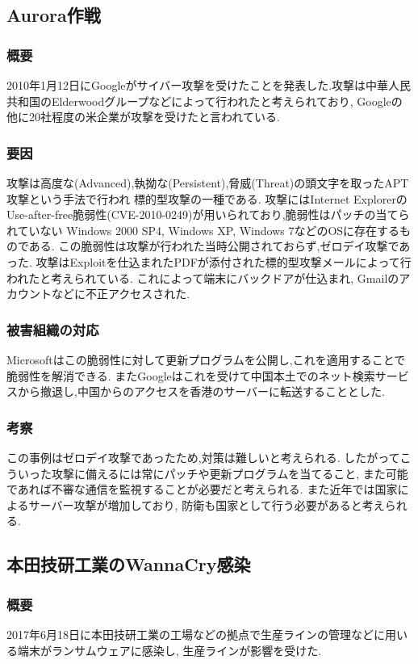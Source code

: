 \documentclass[uplatex,a4j,11pt,dvipdfmx]{jsarticle}
\begin{document}
\subsection{Aurora作戦}
\subsubsection{概要}
2010年1月12日にGoogleがサイバー攻撃を受けたことを発表した.攻撃は中華人民共和国のElderwoodグループなどによって行われたと考えられており,
Googleの他に20社程度の米企業が攻撃を受けたと言われている.\cite{Operatio61:online}
\subsubsection{要因}
攻撃は高度な(Advanced),執拗な(Persistent),脅威(Threat)の頭文字を取ったAPT攻撃という手法で行われ
標的型攻撃の一種である.
攻撃にはInternet ExplorerのUse-after-free脆弱性(CVE-2010-0249)が用いられており,脆弱性はパッチの当てられていない
Windows 2000 SP4, Windows XP, Windows 7などのOSに存在するものである.\cite{CVECVE2083:online}
この脆弱性は攻撃が行われた当時公開されておらず,ゼロデイ攻撃であった.
攻撃はExploitを仕込まれたPDFが添付された標的型攻撃メールによって行われたと考えられている.
これによって端末にバックドアが仕込まれ, Gmailのアカウントなどに不正アクセスされた.
\subsubsection{被害組織の対応}
Microsoftはこの脆弱性に対して更新プログラムを公開し,これを適用することで脆弱性を解消できる.\cite{Microsoft}
またGoogleはこれを受けて中国本土でのネット検索サービスから撤退し,中国からのアクセスを香港のサーバーに転送することとした.
\subsubsection{考察}
この事例はゼロデイ攻撃であったため,対策は難しいと考えられる.
したがってこういった攻撃に備えるには常にパッチや更新プログラムを当てること,
また可能であれば不審な通信を監視することが必要だと考えられる.
また近年では国家によるサーバー攻撃が増加しており,
防衛も国家として行う必要があると考えられる.
\subsection{本田技研工業のWannaCry感染}
\subsubsection{概要}
2017年6月18日に本田技研工業の工場などの拠点で生産ラインの管理などに用いる端末がランサムウェアに感染し,
生産ラインが影響を受けた.\cite{nikkeihonda}
\end{document}
